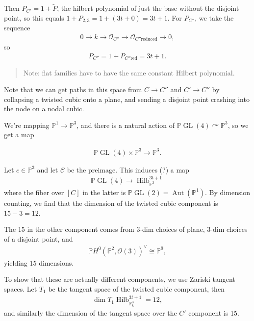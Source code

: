 Then \(P_{C'} = 1 + \tilde P\), the hilbert polynomial of just the base
without the disjoint point, so this equals
\(1 + P_{2, 3} = 1 + (3t + 0) = 3t +1\). For \(P_{C''}\), we take the
sequence
\begin{align*}
0 \to k \to {\mathcal{O}}_{C''} \to {\mathcal{O}}_{C'' \text{reduced}} \to 0
,\end{align*}
so
\begin{align*}
P_{C''} = 1 + P_{C'' \text{red}} = 3t+1
.\end{align*}

\begin{quote}
Note: flat families have to have the same constant Hilbert polynomial.
\end{quote}

Note that we can get paths in this space from \(C\to C''\) and
\(C'\to C''\) by collapsing a twisted cubic onto a plane, and sending a
disjoint point crashing into the node on a nodal cubic.

We're mapping \({\mathbb{P}}^1 \to {\mathbb{P}}^3\), and there is a
natural action of
\({\mathbb{P}}\operatorname{GL}(4) \curvearrowright{\mathbb{P}}^3\), so
we get a map

\begin{align*} {\mathbb{P}}\operatorname{GL}(4) \times{\mathbb{P}}^3 \to {\mathbb{P}}^3 .\end{align*}

Let \(c\in {\mathbb{P}}^3\) and let \({\mathcal{C}}\) be the preimage.
This induces (?) a map
\begin{align*}
{\mathbb{P}}\operatorname{GL}(4) \to \operatorname{Hilb}_{{\mathbb{P}}^3}^{3t+1}
\end{align*}
where the fiber over \([C]\) in the latter is
\({\mathbb{P}}\operatorname{GL}(2) = {\operatorname{Aut}}({\mathbb{P}}^1)\).
By dimension counting, we find that the dimension of the twisted cubic
component is \(15 - 3 = 12\).

The 15 in the other component comes from 3-dim choices of plane, 3-dim
choices of a disjoint point, and
\begin{align*}
{\mathbb{P}}H^0({\mathbb{P}}^2, {\mathcal{O}}(3))^\vee\cong {\mathbb{P}}^9
,\end{align*}
yielding 15 dimensions.

To show that these are actually different components, we use Zariski
tangent spaces. Let \(T_1\) be the tangent space of the twisted cubic
component, then
\begin{align*}
\dim T_1 \operatorname{Hilb}_{{\mathbb{P}}_k^3}^{3t+1} = 12
,\end{align*}
and similarly the dimension of the tangent space over the \(C'\)
component is 15.

